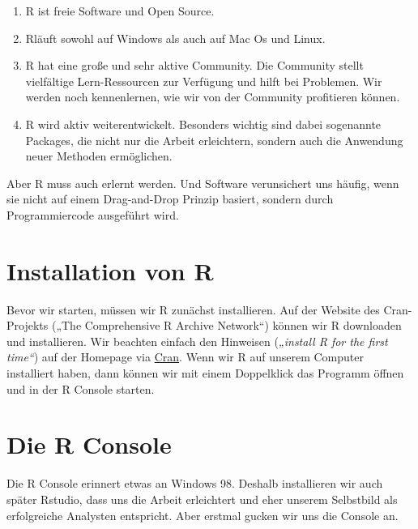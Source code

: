 \documentclass[
]{book}
\providecommand{\tightlist}{%
  \setlength{\itemsep}{0pt}\setlength{\parskip}{0pt}}
\begin{document}
\begin{enumerate}
\def\labelenumi{\arabic{enumi}.}
\tightlist
\item
  R ist freie Software und Open Source.
\item
  Rläuft sowohl auf Windows als auch auf Mac Os und Linux.
\item
  R hat eine große und sehr aktive Community. Die Community stellt vielfältige Lern-Ressourcen zur Verfügung und hilft bei Problemen. Wir werden noch kennenlernen, wie wir von der Community profitieren können.
\item
  R wird aktiv weiterentwickelt. Besonders wichtig sind dabei sogenannte Packages, die nicht nur die Arbeit erleichtern, sondern auch die Anwendung neuer Methoden ermöglichen.
\end{enumerate}

Aber R muss auch erlernt werden. Und Software verunsichert uns häufig, wenn sie nicht auf einem Drag-and-Drop Prinzip basiert, sondern durch Programmiercode ausgeführt wird.

\hypertarget{installation-von-r}{%
\section{Installation von R}\label{installation-von-r}}

Bevor wir starten, müssen wir R zunächst installieren. Auf der Website des Cran-Projekts („The Comprehensive R Archive Network``) können wir R downloaden und installieren. Wir beachten einfach den Hinweisen (\emph{„install R for the first time``}) auf der Homepage via \href{https://cran.r-project.org/}{Cran}. Wenn wir R auf unserem Computer installiert haben, dann können wir mit einem Doppelklick das Programm öffnen und in der R Console starten.

\hypertarget{die-r-console}{%
\section{Die R Console}\label{die-r-console}}

Die R Console erinnert etwas an Windows 98. Deshalb installieren wir auch später Rstudio, dass uns die Arbeit erleichtert und eher unserem Selbstbild als erfolgreiche Analysten entspricht. Aber erstmal gucken wir uns die Console an.
\end{document}
